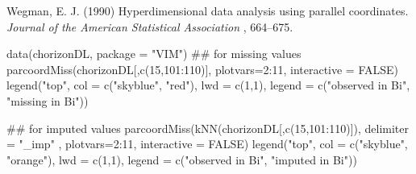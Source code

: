 %
\begin{References}\relax
Wegman, E. J. (1990) Hyperdimensional data analysis using parallel
coordinates. \emph{Journal of the American Statistical Association}
, 664--675.
\end{References}
%
\begin{SeeAlso}\relax
{}
\end{SeeAlso}
%
\begin{Examples}
\begin{ExampleCode}
data(chorizonDL, package = "VIM")
## for missing values
parcoordMiss(chorizonDL[,c(15,101:110)], 
    plotvars=2:11, interactive = FALSE)
legend("top", col = c("skyblue", "red"), lwd = c(1,1), 
    legend = c("observed in Bi", "missing in Bi"))

## for imputed values
parcoordMiss(kNN(chorizonDL[,c(15,101:110)]), delimiter = "_imp" ,
    plotvars=2:11, interactive = FALSE)
legend("top", col = c("skyblue", "orange"), lwd = c(1,1), 
    legend = c("observed in Bi", "imputed in Bi"))
\end{ExampleCode}
\end{Examples}
